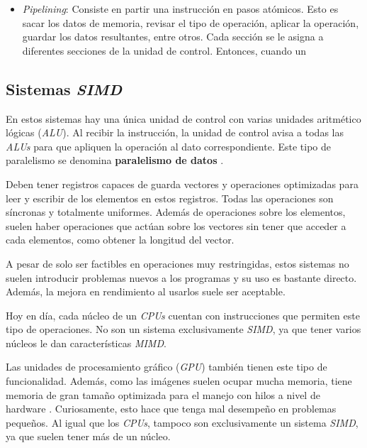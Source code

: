 \begin{itemize}
  \item \emph{Pipelining}:
        Consiste en partir una instrucción en pasos atómicos. Esto es sacar los
        datos de memoria, revisar el tipo de operación, aplicar la operación,
        guardar los datos resultantes, entre otros. Cada sección se le asigna a
        diferentes secciones de la unidad de control. Entonces, cuando un
\end{itemize}


\subsection{Sistemas \textit{SIMD}}

En estos sistemas hay una única unidad de control con varias unidades aritmético
lógicas (\textit{ALU}). Al recibir la instrucción, la unidad de control avisa a
todas las \textit{ALUs} para que apliquen la operación al dato correspondiente.
Este tipo de paralelismo se denomina \textbf{paralelismo de datos}
.

Deben tener registros capaces de guarda vectores y operaciones optimizadas para
leer y escribir de los elementos en estos registros. Todas las operaciones son
síncronas y totalmente uniformes. Además de operaciones sobre los elementos,
suelen haber operaciones que actúan sobre los vectores sin tener que acceder a
cada elementos, como obtener la longitud del vector.

A pesar de solo ser factibles en operaciones muy restringidas, estos sistemas
no suelen introducir problemas nuevos a los programas y su uso es bastante
directo. Además, la mejora en rendimiento al usarlos suele ser aceptable.

Hoy en día, cada núcleo de un \textit{CPUs}  cuentan con
instrucciones que permiten este tipo de operaciones. No son un sistema
exclusivamente \textit{SIMD}, ya que tener varios núcleos le dan
características \textit{MIMD}.

Las unidades de procesamiento gráfico (\textit{GPU})  también tienen
este tipo de funcionalidad. Además, como las imágenes suelen ocupar mucha
memoria, tiene memoria de gran tamaño optimizada para el manejo con hilos a
nivel de hardware . Curiosamente, esto hace que tenga mal
desempeño en problemas pequeños. Al igual que los \textit{CPUs}, tampoco son
exclusivamente un sistema \textit{SIMD}, ya que suelen tener más de un núcleo.

